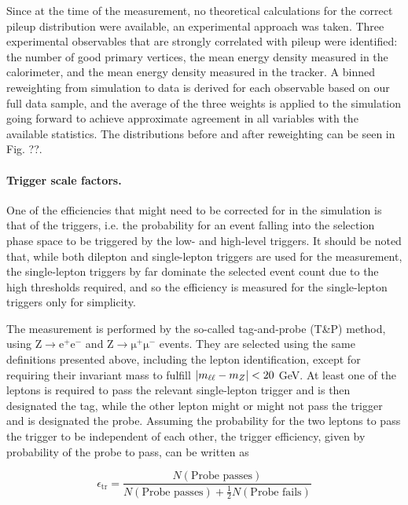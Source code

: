 Since at the time of the measurement, no theoretical calculations for the correct pileup distribution were available, an experimental approach was taken. Three experimental observables that are strongly correlated with pileup were identified: the number of good primary vertices, the mean energy density measured in the calorimeter, and the mean energy density measured in the tracker. A binned reweighting from simulation to data is derived for each observable based on our full data sample, and the average of the three weights is applied to the simulation going forward to achieve approximate agreement in all variables with the available statistics. The distributions before and after reweighting can be seen in Fig. ??.

\paragraph{Trigger scale factors.}

One of the efficiencies that might need to be corrected for in the simulation is that of the triggers, i.e. the probability for an event falling into the selection phase space to be triggered by the low- and high-level triggers. It should be noted that, while both dilepton and single-lepton triggers are used for the measurement, the single-lepton triggers by far dominate the selected event count due to the high \pt thresholds required, and so the efficiency is measured for the single-lepton triggers only for simplicity.

The measurement is performed by the so-called tag-and-probe (T\&P) method, using $\mathrm{Z} \rightarrow \mathrm{e^+ e^-}$ and $\mathrm{Z} \rightarrow \mathrm{\mu^+ \mu^-}$ events. They are selected using the same definitions presented above, including the lepton identification, except for requiring their invariant mass to fulfill $| m_{\ell\ell} - m_Z | < 20$ GeV. At least one of the leptons is required to pass the relevant single-lepton trigger and is then designated the tag, while the other lepton might or might not pass the trigger and is designated the probe. Assuming the probability for the two leptons to pass the trigger to be independent of each other, the trigger efficiency, given by probability of the probe to pass, can be written as

\begin{equation}
    \epsilon_{\mathrm{tr}} = \frac{N (\text{Probe passes})}{ N (\text{Probe passes}) + \frac{1}{2} N (\text{Probe fails}) }
\end{equation}

